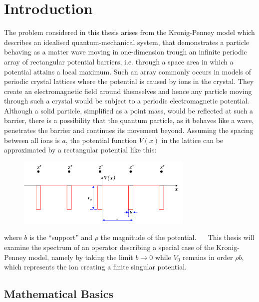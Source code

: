 \chapter{Introduction}

The problem considered in this thesis arises from the Kronig-Penney model which describes an idealised quantum-mechanical system, that demonstrates a particle behaving as a matter wave moving in one-dimension trough an infinite periodic array of rectangular potential barriers, i.e. through a space area in which a potential attains a local maximum. Such an array commonly occurs in models of periodic crystal lattices where the potential is caused by ions in the crystal. They create an electromagnetic field around themselves and hence any particle moving through such a crystal would be subject to a periodic electromagnetic potential. Although a solid particle, simplified as a point mass, would be reflected at such a barrier, there is a possibility that the quantum particle, as it behaves like a wave, penetrates the barrier and continues its movement beyond. Assuming the spacing between all ions is $a$, the potential function $V(x)$ in the lattice can be approximated by a rectangular potential like this:

\begin{figure}[h!] \centering
	  \includegraphics[width=0.75\textwidth]{Periodic_square_potential_130707} 
\end{figure}

where $b$ is the \enquote{support} and $\rho$ the magnitude of the potential.
~\newline ~\newline
This thesis will examine the spectrum of an operator describing a special case of the Kronig-Penney model, namely by taking the limit $b \rightarrow 0$ while $V_{0}$ remains in order $\rho b$, which represents the ion creating a finite singular potential.

\section*{Mathematical Basics}

